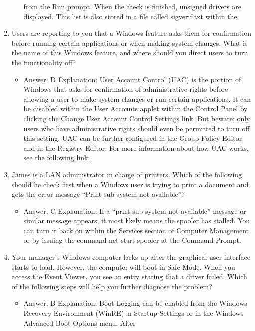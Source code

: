 \documentclass{article}
\begin{document}
\begin{enumerate}
\begin{itemize}
from the Run prompt. When the check is finished, unsigned drivers are displayed. This
list is also stored in a file called sigverif.txt within the
    \end{itemize}
    \item Users are reporting to you that a Windows feature asks them for
confirmation before running certain applications or when making
system changes. What is the name of this Windows feature, and
where should you direct users to turn the functionality off?
    \begin{itemize}
        \item Answer: D
Explanation: User Account Control (UAC) is the portion of Windows that asks for confirmation
of administrative rights before allowing a user to make system changes or
run certain applications. It can be disabled within the User Accounts applet within the
Control Panel by clicking the Change User Account Control Settings link. But beware;
only users who have administrative rights should even be permitted to turn off this
setting. UAC can be further configured in the Group Policy Editor and in the Registry
Editor. For more information about how UAC works, see the following link:
    \end{itemize}
    \item James is a LAN administrator in charge of printers. Which of the
following should he check first when a Windows user is trying to
print a document and gets the error message “Print sub-system
not available”?
    \begin{itemize}
        \item Answer: C
Explanation: If a “print sub-system not available” message or similar message
appears, it most likely means the spooler has stalled. You can turn it back on within the
Services section of Computer Management or by issuing the command net start
spooler at the Command Prompt.
    \end{itemize}
    \item Your manager’s Windows computer locks up after the graphical
user interface starts to load. However, the computer will boot in
Safe Mode. When you access the Event Viewer, you see an entry
stating that a driver failed. Which of the following steps will help
you further diagnose the problem?
    \begin{itemize}
        \item Answer: B
Explanation: Boot Logging can be enabled from the Windows Recovery Environment
(WinRE) in Startup Settings or in the Windows Advanced Boot Options menu. After

\end{itemize}
\end{enumerate}
\end{document}
